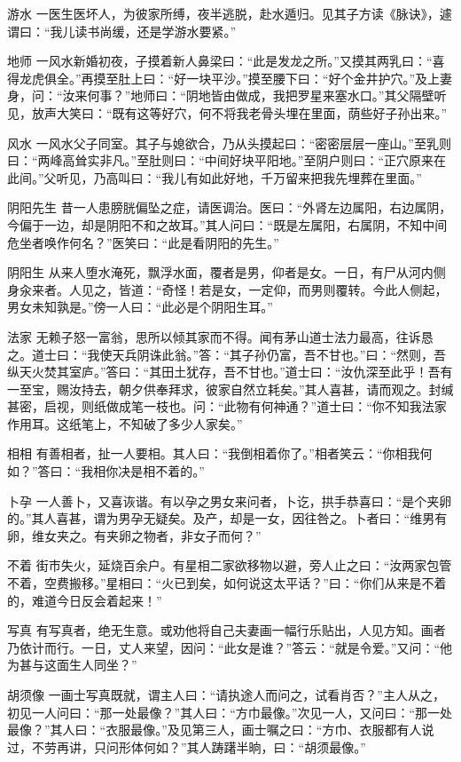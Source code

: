 \documentclass[12pt,UTF8]{ctexbook}
\begin{document}
游水
一医生医坏人，为彼家所缚，夜半逃脱，赴水遁归。见其子方读《脉诀》，遽谓曰：“我儿读书尚缓，还是学游水要紧。”

地师
一风水新婚初夜，子摸着新人鼻梁曰：“此是发龙之所。”又摸其两乳曰：“喜得龙虎俱全。”再摸至肚上曰：“好一块平沙。”摸至腰下曰：“好个金井护穴。”及上妻身，问：“汝来何事？”地师曰：“阴地皆由做成，我把罗星来塞水口。”其父隔壁听见，放声大笑曰：“既有这等好穴，何不将我老骨头埋在里面，荫些好子孙出来。”

风水
一风水父子同室。其子与媳欲合，乃从头摸起曰：“密密层层一座山。”至乳则曰：“两峰高耸实非凡。”至肚则曰：“中间好块平阳地。”至阴户则曰：“正穴原来在此间。”父听见，乃高叫曰：“我儿有如此好地，千万留来把我先埋葬在里面。”

阴阳先生
昔一人患膀胱偏坠之症，请医调治。医曰：“外肾左边属阳，右边属阴，今偏于一边，却是阴阳不和之故耳。”其人问曰：“既是左属阳，右属阴，不知中间危坐者唤作何名？”医笑曰：“此是看阴阳的先生。”

阴阳生
从来人堕水淹死，飘浮水面，覆者是男，仰者是女。一日，有尸从河内侧身汆来者。人见之，皆道：“奇怪！若是女，一定仰，而男则覆转。今此人侧起，男女未知孰是。”傍一人曰：“此必是个阴阳生耳。”

法家
无赖子怒一富翁，思所以倾其家而不得。闻有茅山道士法力最高，往诉恳之。道士曰：“我使天兵阴诛此翁。”答：“其子孙仍富，吾不甘也。”曰：“然则，吾纵天火焚其室庐。”答曰：“其田土犹存，吾不甘也。”道士曰：“汝仇深至此乎！吾有一至宝，赐汝持去，朝夕供奉拜求，彼家自然立耗矣。”其人喜甚，请而观之。封缄甚密，启视，则纸做成笔一枝也。问：“此物有何神通？”道士曰：“你不知我法家作用耳。这纸笔上，不知破了多少人家矣。”

相相
有善相者，扯一人要相。其人曰：“我倒相着你了。”相者笑云：“你相我何如？”答曰：“我相你决是相不着的。”

卜孕
一人善卜，又喜诙谐。有以孕之男女来问者，卜讫，拱手恭喜曰：“是个夹卵的。”其人喜甚，谓为男孕无疑矣。及产，却是一女，因往咎之。卜者曰：“维男有卵，维女夹之。有夹卵之物者，非女子而何？”

不着
街市失火，延烧百余户。有星相二家欲移物以避，旁人止之曰：“汝两家包管不着，空费搬移。”星相曰：“火已到矣，如何说这太平话？”曰：“你们从来是不着的，难道今日反会着起来！”

写真
有写真者，绝无生意。或劝他将自己夫妻画一幅行乐贴出，人见方知。画者乃依计而行。一日，丈人来望，因问：“此女是谁？”答云：“就是令爱。”又问：“他为甚与这面生人同坐？”

胡须像
一画士写真既就，谓主人曰：“请执途人而问之，试看肖否？”主人从之，初见一人问曰：“那一处最像？”其人曰：“方巾最像。”次见一人，又问曰：“那一处最像？”其人曰：“衣服最像。”及见第三人，画士嘱之曰：“方巾、衣服都有人说过，不劳再讲，只问形体何如？”其人踌躇半晌，曰：“胡须最像。”
\end{document}
